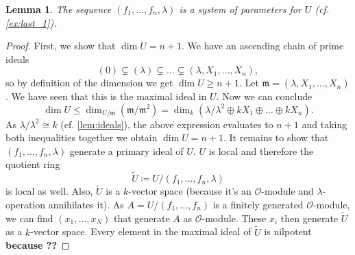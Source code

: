 \documentclass{article}
\theoremstyle{plain}%
\newtheorem{lemma}{Lemma}[section]
\theoremstyle{definition}
\theoremstyle{remark}
\begin{document}
    \begin{lemma}
        The sequence \((f_1, \dots, f_n, \lambda)\) is a system of parameters for \(U\) (cf. \cref{ex:last_1}).
    \end{lemma}
    \begin{proof}
        First, we show that \(\dim U = n + 1\).
        We have an ascending chain of prime ideals
        \[
            (0) \subsetneq (\lambda) \subsetneq \dots \subsetneq (\lambda, X_1, \dots, X_n),  
        \]
        so by definition of the dimension we get \(\dim U \geq n + 1\).
        Let \(\mathfrak{m} = (\lambda, X_1, \dots, X_n)\). We have seen that this is the maximal ideal in \(U\).
        Now we can conclude
        \[
            \dim U \leq \dim_{U/\mathfrak{m}}(\mathfrak{m}/\mathfrak{m}^2) 
            = \dim_k(\lambda/\lambda^2 \oplus k X_1 \oplus \dots \oplus k X_n).
        \]
        As \(\lambda/\lambda^2 \cong k\) (cf. \cref{lem:ideals}), the above expression evaluates to \(n+1\) and
        taking both inequalities together we obtain \(\dim U = n + 1\).
        It remains to show that \((f_1, \dots, f_n, \lambda)\) generate a primary ideal of \(U\).
        \(U\) is local and therefore the quotient ring 
        \[\tilde{U} \coloneqq U/(f_1, \dots, f_n, \lambda)\] 
        is local as well.
        Also, \(\tilde U\) is a \(k\)-vector space (because it's an \(\mathcal{O}\)-module and \(\lambda\)-operation
        annihilates it). As \(A = U/(f_1, \dots, f_n)\) is a finitely generated \(\mathcal{O}\)-module, we can find
        \((x_1, \dots, x_N)\) that generate \(A\) as \(\mathcal{O}\)-module.
        These \(x_i\) then generate \(\tilde U\) as a \(k\)-vector space.
        Every element in the maximal ideal of \(\tilde U\) is nilpotent \textbf{because ??}
    \end{proof}
    
\end{document}
